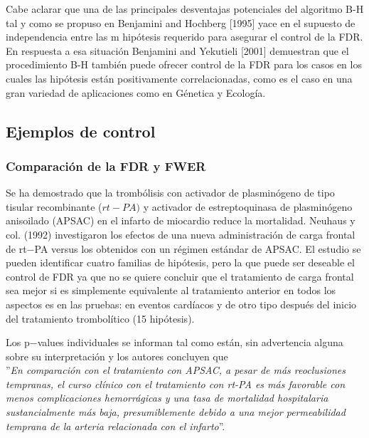 \documentclass[11pt,letterpaper]{article}
\begin{document}
Cabe aclarar que una de las principales desventajas potenciales del algoritmo B-H tal y como se propuso en Benjamini and Hochberg [1995] yace en el supuesto de independencia entre las m hipótesis requerido para asegurar el control de la FDR. En respuesta a esa situación Benjamini and Yekutieli [2001] demuestran que el procedimiento B-H también puede ofrecer control de la FDR para los casos en los cuales las hipótesis están positivamente correlacionadas, como es el caso en una gran variedad de aplicaciones como en Génetica y Ecología. 



\subsection{Ejemplos de control}

\subsubsection*{Comparación de la FDR y FWER}
Se ha demostrado que la trombólisis con activador de plasminógeno de tipo tisular recombinante ($rt-PA)$ y activador de estreptoquinasa de plasminógeno anisoilado (APSAC) en el infarto de miocardio reduce la mortalidad. Neuhaus y col. (1992) investigaron los efectos de una nueva administración de carga frontal de rt$-$PA versus los obtenidos con un régimen estándar de APSAC. El estudio se pueden identificar cuatro familias de hipótesis, pero la que puede ser deseable el control de FDR ya que no se quiere concluir que el tratamiento de carga frontal sea mejor si es simplemente equivalente al tratamiento anterior en todos los aspectos es en las pruebas: en eventos cardíacos y de otro tipo después del inicio del tratamiento trombolítico (15 hipótesis).

Los p$-$values individuales se informan tal como están, sin advertencia alguna sobre su interpretación y los autores concluyen que\\

''\textit{En comparación con el tratamiento con APSAC, a pesar de más reoclusiones tempranas, el curso clínico con el tratamiento con rt-PA es más favorable con menos complicaciones hemorrágicas y una tasa de mortalidad hospitalaria sustancialmente más baja, presumiblemente debido a una mejor permeabilidad temprana de la arteria relacionada con el infarto}''.\\
\end{document}
